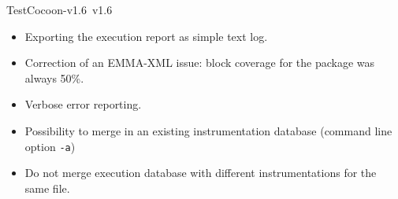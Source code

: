 \begin{TestCocoonDownload}
\begin{ReleaseNote}{TestCocoon-v1.6}{\TestCocoon\ v1.6}
\begin{description}
\begin{itemize}
  \end{itemize}
\item[\cmreport]
  \begin{itemize}
    \item \NewFeature Exporting the execution report as simple text log.
    \item \BugFix Correction of an EMMA-XML issue: block coverage for the package was always 50\%.
  \end{itemize}
\item[\cmmerge]
  \begin{itemize}
    \item \NewFeature Verbose error reporting.
    \item \NewFeature Possibility to merge in an existing instrumentation database (command line option \verb$-a$)
    \item \BugFix     Do not merge execution database with different instrumentations for the same file.
  \end{itemize}
\end{description}
\end{ReleaseNote}
\end{TestCocoonDownload}



